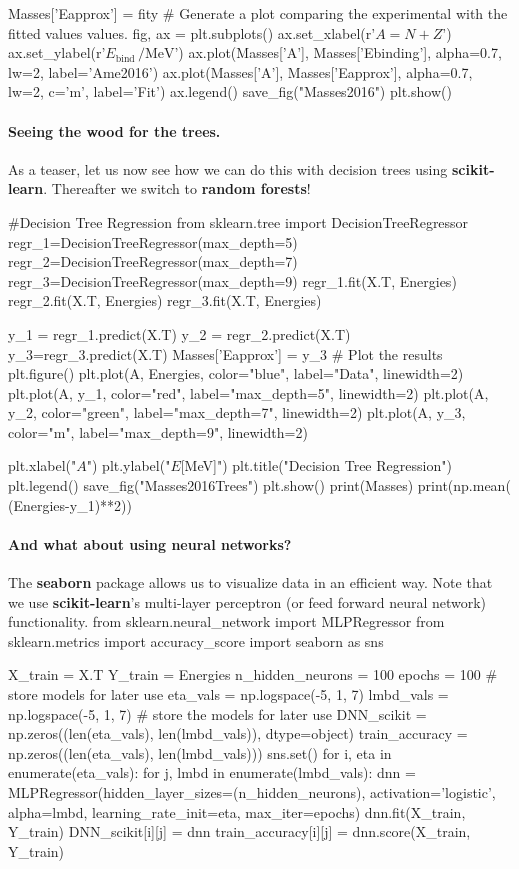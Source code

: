 \documentclass[%
oneside,                 %
final,                   %
10pt]{article}
\begin{document}
Masses['Eapprox']  = fity
# Generate a plot comparing the experimental with the fitted values values.
fig, ax = plt.subplots()
ax.set_xlabel(r'$A = N + Z$')
ax.set_ylabel(r'$E_\mathrm{bind}\,/\mathrm{MeV}$')
ax.plot(Masses['A'], Masses['Ebinding'], alpha=0.7, lw=2,
            label='Ame2016')
ax.plot(Masses['A'], Masses['Eapprox'], alpha=0.7, lw=2, c='m',
            label='Fit')
ax.legend()
save_fig("Masses2016")
plt.show()
\epycod


\paragraph{Seeing the wood for the trees.}
As a teaser, let us now see how we can do this with decision trees using \textbf{scikit-learn}. Thereafter we switch to \textbf{random forests}!


\bpycod

#Decision Tree Regression
from sklearn.tree import DecisionTreeRegressor
regr_1=DecisionTreeRegressor(max_depth=5)
regr_2=DecisionTreeRegressor(max_depth=7)
regr_3=DecisionTreeRegressor(max_depth=9)
regr_1.fit(X.T, Energies)
regr_2.fit(X.T, Energies)
regr_3.fit(X.T, Energies)


y_1 = regr_1.predict(X.T)
y_2 = regr_2.predict(X.T)
y_3=regr_3.predict(X.T)
Masses['Eapprox'] = y_3
# Plot the results
plt.figure()
plt.plot(A, Energies, color="blue", label="Data", linewidth=2)
plt.plot(A, y_1, color="red", label="max_depth=5", linewidth=2)
plt.plot(A, y_2, color="green", label="max_depth=7", linewidth=2)
plt.plot(A, y_3, color="m", label="max_depth=9", linewidth=2)

plt.xlabel("$A$")
plt.ylabel("$E$[MeV]")
plt.title("Decision Tree Regression")
plt.legend()
save_fig("Masses2016Trees")
plt.show()
print(Masses)
print(np.mean( (Energies-y_1)**2))
\epycod


\paragraph{And what about using neural networks?}
The \textbf{seaborn} package allows us to visualize data in an efficient way. Note that we use \textbf{scikit-learn}'s multi-layer perceptron (or feed forward neural network) 
functionality.
\bpycod
from sklearn.neural_network import MLPRegressor
from sklearn.metrics import accuracy_score
import seaborn as sns

X_train = X.T
Y_train = Energies
n_hidden_neurons = 100
epochs = 100
# store models for later use
eta_vals = np.logspace(-5, 1, 7)
lmbd_vals = np.logspace(-5, 1, 7)
# store the models for later use
DNN_scikit = np.zeros((len(eta_vals), len(lmbd_vals)), dtype=object)
train_accuracy = np.zeros((len(eta_vals), len(lmbd_vals)))
sns.set()
for i, eta in enumerate(eta_vals):
    for j, lmbd in enumerate(lmbd_vals):
        dnn = MLPRegressor(hidden_layer_sizes=(n_hidden_neurons), activation='logistic',
                            alpha=lmbd, learning_rate_init=eta, max_iter=epochs)
        dnn.fit(X_train, Y_train)
        DNN_scikit[i][j] = dnn
        train_accuracy[i][j] = dnn.score(X_train, Y_train)
\end{document}
